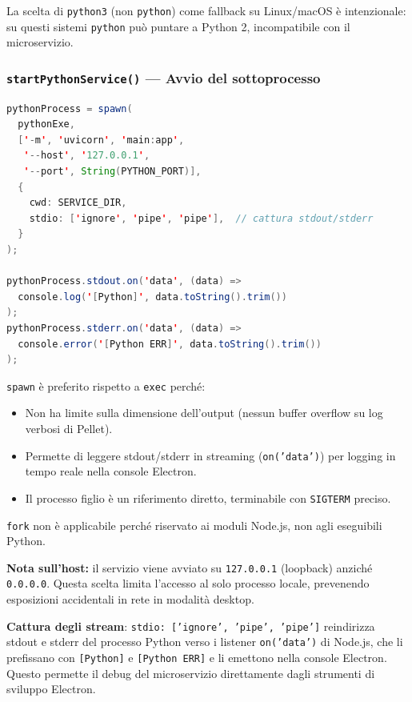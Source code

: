 \documentclass[a4paper,12pt]{article}
\begin{document}
La scelta di \texttt{python3} (non \texttt{python}) come fallback su
Linux/macOS \`{e} intenzionale: su questi sistemi \texttt{python}
pu\`{o} puntare a Python 2, incompatibile con il microservizio.

\subsubsection{\texttt{startPythonService()} --- Avvio del sottoprocesso}

\begin{lstlisting}[language=Java, caption={Avvio di uvicorn come sottoprocesso Node.js.}]
pythonProcess = spawn(
  pythonExe,
  ['-m', 'uvicorn', 'main:app',
   '--host', '127.0.0.1',
   '--port', String(PYTHON_PORT)],
  {
    cwd: SERVICE_DIR,
    stdio: ['ignore', 'pipe', 'pipe'],  // cattura stdout/stderr
  }
);

pythonProcess.stdout.on('data', (data) =>
  console.log('[Python]', data.toString().trim())
);
pythonProcess.stderr.on('data', (data) =>
  console.error('[Python ERR]', data.toString().trim())
);
\end{lstlisting}

\noindent \begin{infobox}
\texttt{spawn} \`{e} preferito rispetto a \texttt{exec} perch\'{e}:
\begin{itemize}[noitemsep]
  \item Non ha limite sulla dimensione dell'output (nessun buffer overflow
        su log verbosi di Pellet).
  \item Permette di leggere stdout/stderr in streaming (\texttt{on('data')})
        per logging in tempo reale nella console Electron.
  \item Il processo figlio \`{e} un riferimento diretto, terminabile
        con \texttt{SIGTERM} preciso.
\end{itemize}
\texttt{fork} non \`{e} applicabile perch\'{e} riservato ai moduli
Node.js, non agli eseguibili Python.
\end{infobox}

\textbf{Nota sull'host:} il servizio viene avviato su \texttt{127.0.0.1}
(loopback) anzich\'{e} \texttt{0.0.0.0}. Questa scelta limita l'accesso
al solo processo locale, prevenendo esposizioni accidentali in rete in
modalit\`{a} desktop.

\textbf{Cattura degli stream}: \texttt{stdio: ['ignore', 'pipe', 'pipe']}
reindirizza stdout e stderr del processo Python verso i listener
\texttt{on('data')} di Node.js, che li prefissano con \texttt{[Python]}
e \texttt{[Python ERR]} e li emettono nella console Electron. Questo
permette il debug del microservizio direttamente dagli strumenti
di sviluppo Electron.
\end{document}
